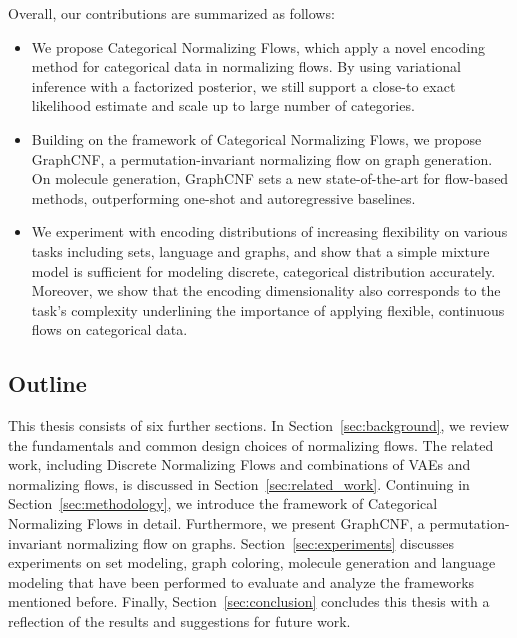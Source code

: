Overall, our contributions are summarized as follows:
\begin{itemize}
	\item We propose Categorical Normalizing Flows, which apply a novel encoding method for categorical data in normalizing flows. 
	By using variational inference with a factorized posterior, we still support a close-to exact likelihood estimate and scale up to large number of categories.
	\item Building on the framework of Categorical Normalizing Flows, we propose GraphCNF, a permutation-invariant normalizing flow on graph generation.
	On molecule generation, GraphCNF sets a new state-of-the-art for flow-based methods, outperforming one-shot and autoregressive baselines. 
	\item We experiment with encoding distributions of increasing flexibility on various tasks including sets, language and graphs, and show that a simple mixture model is sufficient for modeling discrete, categorical distribution accurately. Moreover, we show that the encoding dimensionality also corresponds to the task's complexity underlining the importance of applying flexible, continuous flows on categorical data.
\end{itemize}


\subsection{Outline}
\label{sec:introduction_outline}
This thesis consists of six further sections. In Section~\ref{sec:background}, we review the fundamentals and common design choices of normalizing flows. 
The related work, including Discrete Normalizing Flows and combinations of \acp{VAE} and normalizing flows, is discussed in Section~\ref{sec:related_work}. 
Continuing in Section~\ref{sec:methodology}, we introduce the framework of Categorical Normalizing Flows in detail. Furthermore, we present GraphCNF, a permutation-invariant normalizing flow on graphs. 
Section~\ref{sec:experiments} discusses experiments on set modeling, graph coloring, molecule generation and language modeling that have been performed to evaluate and analyze the frameworks mentioned before. 
Finally, Section~\ref{sec:conclusion} concludes this thesis with a reflection of the results and suggestions for future work. 